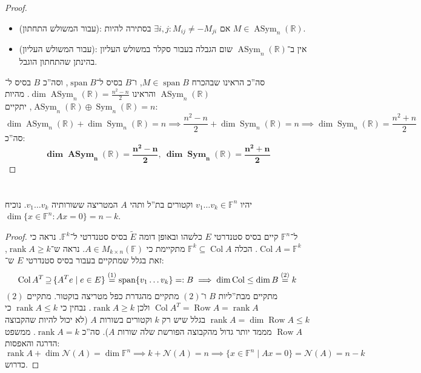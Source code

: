 \documentclass[]{article}
\newcommand\R     {\mathbb{R}}
\newcommand\nc    {\mathcal{N}}
\DeclareMathOperator{\Sp}     {span}
\DeclareMathOperator{\row}    {Row}
\DeclareMathOperator{\rk}     {rank}
\DeclareMathOperator{\col}    {Col}
\DeclareMathOperator{\Sym}     {Sym}
\DeclareMathOperator{\Asym}    {ASym}
\newcommand\F         {\mathbb{F}}
\newcommand\co        {\colon}
\newcommand\tl    {\tilde}
\theoremstyle{definition}
\begin{document}
\begin{proof}
\begin{itemize}
        \item (עבור המשולש התחתון): אם $\exists i, j \co M_{ij} \neq -M_{ji}$ בסתירה להיות $M \in \Asym_n(\R)$. 
        \item (עבור המשולש העליון): אין ב־$\Asym_n(\R)$ שום הגבלה בעבור סקלר במשולש העליון בהינתן שהתחתון הוגבל. 
    \end{itemize}
    סה''כ הראינו שבהכרח $M \in \Sp B$, ו־$B$ בסיס ל־$\Sp B$, וסה''כ $B$ בסיס ל־$\Asym_n(\R)$ והראינו $\dim \Asym_n(\R) = \frac{n^2 - n}{2}$. מהיות $\Asym_n(\R) \oplus \Sym_n(\R) =n$, יתקיים: 
        \[ \dim \Asym_n(\R) + \dim\Sym_n(\R) = n \implies \frac{n^2 - n}{2} + \dim \Sym_n(\R) = n \implies \dim \Sym_n(\R) = \frac{n^2 + n}{2} \]
        סה''כ: 
        \[ \bm{\dim \Asym_n(\R) = \frac{n^2 - n}{2}, \ \dim \Sym_n(\R) = \frac{n^2 + n}{2}} \]
    \end{proof}
    
    \section{}
    יהיו $v_1 \dots v_k \in \F^n$ וקטורים בת''ל ותהי $A$ המטריצה ששורותיה $v_1 \dots v_k$. נוכיח $\dim\{x \in \F^n \co Ax = 0\} = n - k$. \begin{proof}
        ל־$\F^n$ קיים בסיס סטנדרטי $E$ כלשהו ובאופן דומה $\tl E$ בסיס סטנדרטי ל־$\F^k$. נראה כי $\col A = \F^{k}$. הכלה $\F^k \subseteq \col A$ מתקיימת כי $A \in M_{k \times n}(\F)$. נראה ש־$\rk A \ge k$, זאת בגלל שמתקיים בעבור בסיס סטנדרטי $E$ ש־: 
        \[ \col A^T \, \reflectbox{$\subseteq$}\, \{A^Te \mid e \in E\} \overset{(1)}{=} \Sp \{v_1 \dots v_k\} =: B \implies \dim \col \le \dim B \overset{(2)}{=} k \]
        $(2)$ מתקיים מבת''ליות $B$ ו־$(2)$ מתקיים מהגדרת כפל מטריצה בוקטור. מתקיים $\col A^T = \row A = \rk A$ ולכן $\rk A \ge k$. 
        נבחין כי $\rk A \le k$ כי $\rk A = \dim \row A \le k$ בגלל שיש רק $k$ וקטורים בשורות $A$ (לא יכול להיות שהקבוצה $\row A$ מממד יותר גדול מהקבוצה הפורשת שלה שורות $A$). סה''כ $\rk A = k$. ממשפט הדרגה והאפסות: 
        \[ \rk A + \dim \nc(A) = \dim \F^{n} \implies k + \nc(A) = n \implies \{x \in \F^n \mid Ax = 0\} = \nc(A) = n - k \]
        כדרוש. 
    \end{proof}
    
\end{document}
